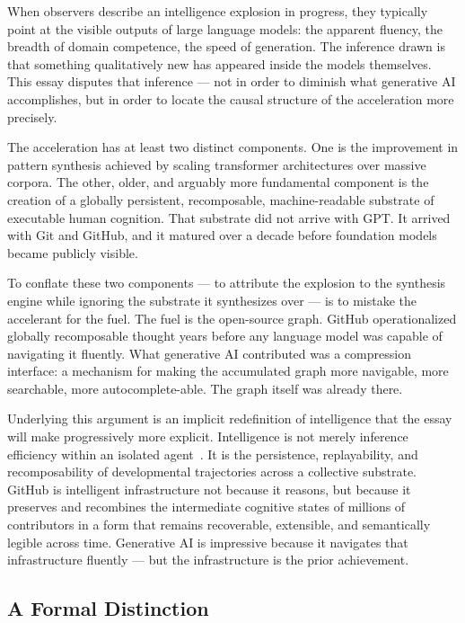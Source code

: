 \documentclass[11pt]{article}
\begin{document}
When observers describe an intelligence explosion in progress, they typically
point at the visible outputs of large language models: the apparent fluency,
the breadth of domain competence, the speed of generation. The inference drawn
is that something qualitatively new has appeared inside the models themselves.
This essay disputes that inference --- not in order to diminish what generative
AI accomplishes, but in order to locate the causal structure of the acceleration
more precisely.

The acceleration has at least two distinct components. One is the improvement
in pattern synthesis achieved by scaling transformer architectures over massive
corpora. The other, older, and arguably more fundamental component is the
creation of a globally persistent, recomposable, machine-readable substrate of
executable human cognition. That substrate did not arrive with GPT. It arrived
with Git and GitHub, and it matured over a decade before foundation models
became publicly visible.

To conflate these two components --- to attribute the explosion to the synthesis
engine while ignoring the substrate it synthesizes over --- is to mistake the
accelerant for the fuel. The fuel is the open-source graph. GitHub
operationalized globally recomposable thought years before any language model
was capable of navigating it fluently. What generative AI contributed was a
compression interface: a mechanism for making the accumulated graph more
navigable, more searchable, more autocomplete-able. The graph itself was already
there.

Underlying this argument is an implicit redefinition of intelligence that the
essay will make progressively more explicit. Intelligence is not merely
inference efficiency within an isolated agent~\cite{russell2010}. It is the
persistence, replayability, and recomposability of developmental trajectories
across a collective substrate. GitHub is intelligent infrastructure not because
it reasons, but because it preserves and recombines the intermediate cognitive
states of millions of contributors in a form that remains recoverable,
extensible, and semantically legible across time. Generative AI is impressive
because it navigates that infrastructure fluently --- but the infrastructure is
the prior achievement.

\subsection*{A Formal Distinction}
\end{document}
